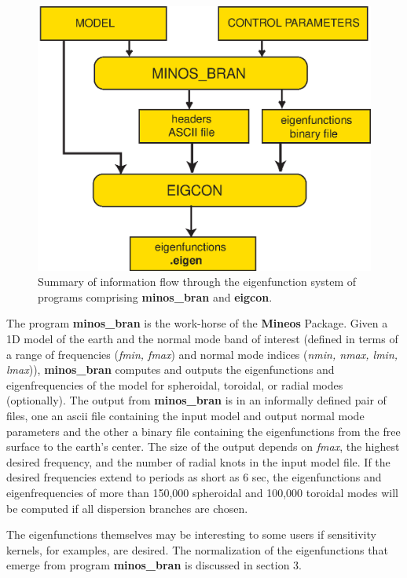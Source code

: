 \documentclass[11pt]{article}
\begin{document}
\begin{figure}
\begin{center}
\includegraphics[width=5in]{Figures/Fig1}
\caption{Summary of information flow through the eigenfunction system of
programs comprising {\bf minos\_bran} and {\bf eigcon}.}
\label{fig:1}
\end{center}
\end{figure}

The program {\bf minos\_bran} is the work-horse of the {\bf Mineos} Package.
Given a 1D model of the earth and the normal mode band of interest (defined
in terms of a range of frequencies ({\it fmin, fmax}) and normal mode
indices ({\it nmin, nmax, lmin, lmax})), {\bf minos\_bran} computes and outputs the
eigenfunctions and eigenfrequencies of the model for spheroidal, toroidal,
or radial modes (optionally). The output from {\bf minos\_bran}
is in an informally defined pair of files, one an ascii file containing
the input model and output normal mode parameters and the other a binary file
containing the eigenfunctions from the free surface to the earth's center.
The size of the output depends on {\it fmax}, the highest
desired frequency, and the number of radial knots in the input model
file. If the desired frequencies extend to periods as short as
6 sec, the eigenfunctions and eigenfrequencies of more than 150,000 spheroidal 
and 100,000 toroidal modes will be computed if all dispersion branches
are chosen. 

The eigenfunctions themselves may be interesting to some users if sensitivity
kernels, for examples, are desired. The normalization of the eigenfunctions
that emerge from program {\bf minos\_bran} is discussed in section 3.
\end{document}
